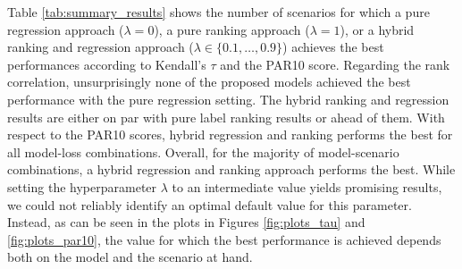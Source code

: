 \documentclass[runningheads]{llncs}
\begin{document}
Table \ref{tab:summary_results} shows the number of scenarios for which a pure regression approach ($\lambda=0$), a pure ranking approach ($\lambda = 1$), or a hybrid ranking and regression approach ($\lambda \in \{0.1, \ldots , 0.9 \}$) achieves the best performances according to Kendall's $\tau$ and the PAR10 score. Regarding the rank correlation, unsurprisingly none of the proposed models achieved the best performance with the pure regression setting. The hybrid ranking and regression results are either on par with pure label ranking results or ahead of them. With respect to the PAR10 scores, hybrid regression and ranking performs the best for all model-loss combinations. Overall, for the majority of model-scenario combinations, a hybrid regression and ranking approach performs the best. While setting the hyperparameter $\lambda$ to an intermediate value yields promising results, we could not reliably identify an optimal default value for this parameter. Instead, as can be seen in the plots in Figures \ref{fig:plots_tau} and \ref{fig:plots_par10}, the value for which the best performance is achieved depends both on the model and the scenario at hand. 
\end{document}
